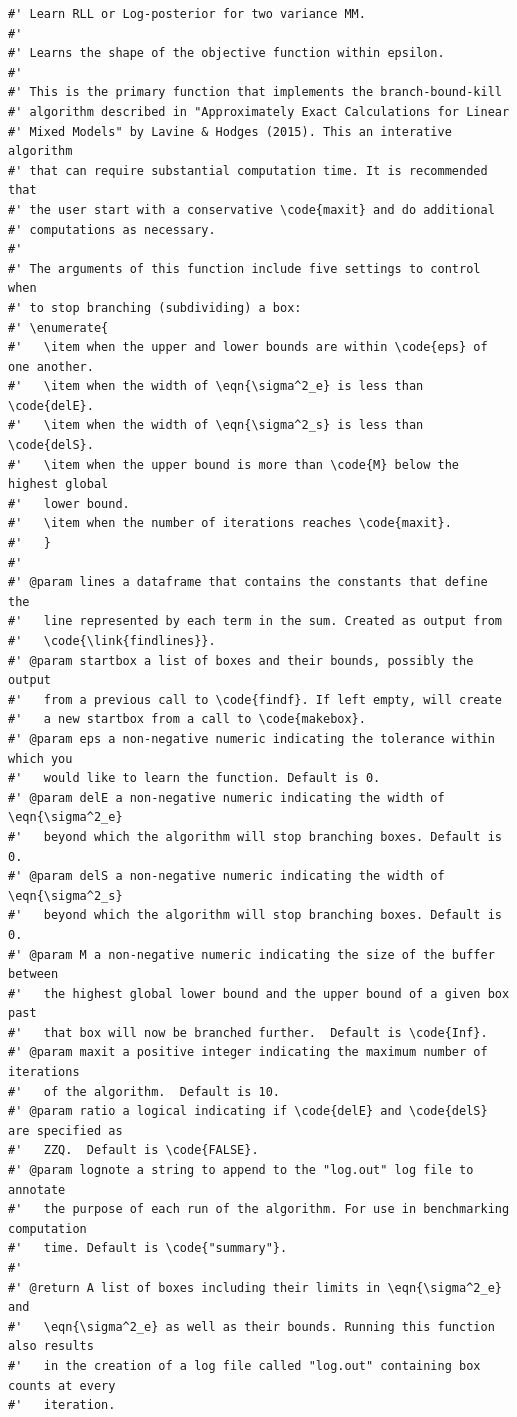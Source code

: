 \documentclass[ejs]{imsart}
\begin{document}
\begin{verbatim}
#' Learn RLL or Log-posterior for two variance MM.
#'
#' Learns the shape of the objective function within epsilon.
#'
#' This is the primary function that implements the branch-bound-kill
#' algorithm described in "Approximately Exact Calculations for Linear
#' Mixed Models" by Lavine & Hodges (2015). This an interative algorithm
#' that can require substantial computation time. It is recommended that
#' the user start with a conservative \code{maxit} and do additional
#' computations as necessary.
#'
#' The arguments of this function include five settings to control when
#' to stop branching (subdividing) a box:
#' \enumerate{
#'   \item when the upper and lower bounds are within \code{eps} of one another.
#'   \item when the width of \eqn{\sigma^2_e} is less than \code{delE}.
#'   \item when the width of \eqn{\sigma^2_s} is less than \code{delS}.
#'   \item when the upper bound is more than \code{M} below the highest global
#'   lower bound.
#'   \item when the number of iterations reaches \code{maxit}.
#'   }
#'
#' @param lines a dataframe that contains the constants that define the
#'   line represented by each term in the sum. Created as output from
#'   \code{\link{findlines}}.
#' @param startbox a list of boxes and their bounds, possibly the output
#'   from a previous call to \code{findf}. If left empty, will create
#'   a new startbox from a call to \code{makebox}.
#' @param eps a non-negative numeric indicating the tolerance within which you
#'   would like to learn the function. Default is 0.
#' @param delE a non-negative numeric indicating the width of \eqn{\sigma^2_e}
#'   beyond which the algorithm will stop branching boxes. Default is 0.
#' @param delS a non-negative numeric indicating the width of \eqn{\sigma^2_s}
#'   beyond which the algorithm will stop branching boxes. Default is 0.
#' @param M a non-negative numeric indicating the size of the buffer between
#'   the highest global lower bound and the upper bound of a given box past
#'   that box will now be branched further.  Default is \code{Inf}.
#' @param maxit a positive integer indicating the maximum number of iterations
#'   of the algorithm.  Default is 10.
#' @param ratio a logical indicating if \code{delE} and \code{delS} are specified as
#'   ZZQ.  Default is \code{FALSE}.
#' @param lognote a string to append to the "log.out" log file to annotate
#'   the purpose of each run of the algorithm. For use in benchmarking computation
#'   time. Default is \code{"summary"}.
#'
#' @return A list of boxes including their limits in \eqn{\sigma^2_e} and
#'   \eqn{\sigma^2_e} as well as their bounds. Running this function also results
#'   in the creation of a log file called "log.out" containing box counts at every
#'   iteration.


\end{verbatim}
\end{document}
